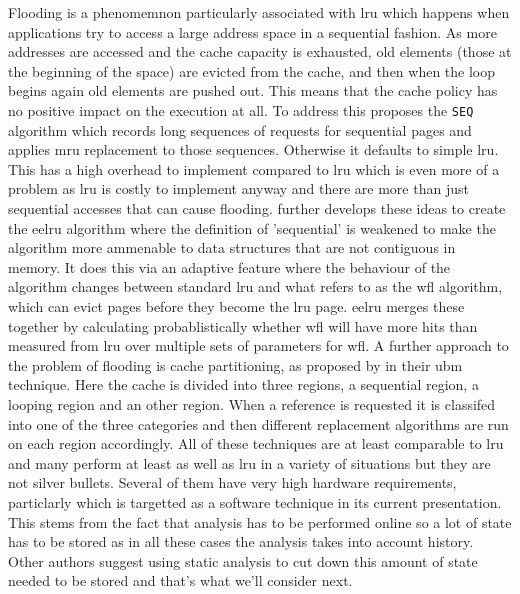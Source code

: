 Flooding is a phenomemnon particularly associated with \gls{lru} which happens when applications try to access a large address space in a sequential fashion. As more addresses are accessed and the cache capacity is exhausted, old elements (those at the beginning of the space) are evicted from the cache, and then when the loop begins again old elements are pushed out. This means that the cache policy has no positive impact on the execution at all. To address this \citet{glassAdaptivePageReplacement1997} proposes the \texttt{SEQ} algorithm which records long sequences of requests for sequential pages and applies \gls{mru} replacement to those sequences. Otherwise it defaults to simple \gls{lru}. This has a high overhead to implement compared to \gls{lru} which is even more of a problem as \gls{lru} is costly to implement anyway and there are more than just sequential accesses that can cause flooding. \citet{smaragdakisEELRUSimpleEffective1999} further develops these ideas to create the \gls{eelru} algorithm where the definition of 'sequential' is weakened to make the algorithm more ammenable to data structures that are not contiguous in memory. It does this via an adaptive feature where the behaviour of the algorithm changes between standard \gls{lru} and what \citeauthor{smaragdakisEELRUSimpleEffective1999} refers to as the \gls{wfl} algorithm, which can evict pages before they become the \gls{lru} page. \gls{eelru} merges these together by calculating probablistically whether \gls{wfl} will have more hits than measured from \gls{lru} over multiple sets of parameters for \gls{wfl}. A further approach to the problem of flooding is cache partitioning, as proposed by \citeauthor{kimLowoverheadHighperformanceUnified2000} in their \gls{ubm} technique. Here the cache is divided into three regions, a sequential region, a looping region and an other region. When a reference is requested it is classifed into one of the three categories and then different replacement algorithms are run on each region accordingly. All of these techniques are at least comparable to \gls{lru} and many perform at least as well as \gls{lru} in a variety of situations but they are not silver bullets. Several of them have very high hardware requirements, particlarly \citet{kimLowoverheadHighperformanceUnified2000} which is targetted as a software technique in its current presentation. This stems from the fact that analysis has to be performed online so a lot of state has to be stored as in all these cases the analysis takes into account history. Other authors suggest using static analysis to cut down this amount of state needed to be stored and that's what we'll consider next.

